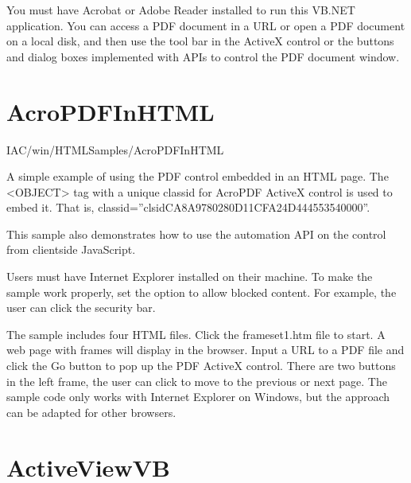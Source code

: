 \documentclass[letterpaper,12pt,english,openany,oneside]{sphinxmanual}
\begin{document}

You must have Acrobat or Adobe Reader installed to run this VB.NET application. You can access a PDF document in a URL or open a PDF document on a local disk, and then use the tool bar in the ActiveX control or the buttons and dialog boxes implemented with APIs to control the PDF document window.


\section{AcroPDFInHTML}
\label{\detokenize{Samples_WindowsIAC:acropdfinhtml}}\label{\detokenize{Samples_WindowsIAC:location-1}}

IAC/win/HTMLSamples/AcroPDFInHTML

\label{\detokenize{Samples_WindowsIAC:description-1}}

A simple example of using the PDF control embedded in an HTML page. The <OBJECT> tag with a unique classid for AcroPDF ActiveX control is used to embed it. That is, classid=”clsidCA8A9780\sphinxhyphen{}280D\sphinxhyphen{}11CF\sphinxhyphen{}A24D\sphinxhyphen{}444553540000”.

This sample also demonstrates how to use the automation API on the control from client\sphinxhyphen{}side JavaScript.

\label{\detokenize{Samples_WindowsIAC:usage-1}}

Users must have Internet Explorer installed on their machine. To make the sample work properly, set the option to allow blocked content. For example, the user can click the security bar.

The sample includes four HTML files. Click the frameset1.htm file to start. A web page with frames will display in the browser. Input a URL to a PDF file and click the Go button to pop up the PDF ActiveX control. There are two buttons in the left frame, the user can click to move to the previous or next page. The sample code only works with Internet Explorer on Windows, but the approach can be adapted for other browsers.


\section{ActiveViewVB}
\label{\detokenize{Samples_WindowsIAC:activeviewvb}}\label{\detokenize{Samples_WindowsIAC:location-2}}
\end{document}
